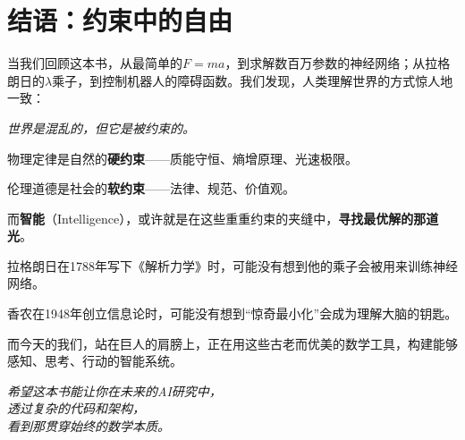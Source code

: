\documentclass[11pt,a4paper,twoside,openright]{book}
\theoremstyle{definition}
\begin{document}
 


\section*{结语：约束中的自由}


 

\vspace{1cm}

 

当我们回顾这本书，从最简单的$F = ma$，到求解数百万参数的神经网络；从拉格朗日的$\lambda$乘子，到控制机器人的障碍函数。我们发现，人类理解世界的方式惊人地一致：

 

\begin{center}

\textit{世界是混乱的，但它是被约束的。}

\end{center}

 

物理定律是自然的\textbf{硬约束}——质能守恒、熵增原理、光速极限。

 

伦理道德是社会的\textbf{软约束}——法律、规范、价值观。

 

而\textbf{智能}（Intelligence），或许就是在这些重重约束的夹缝中，\textbf{寻找最优解的那道光}。

 

\vspace{0.5cm}

 

拉格朗日在1788年写下《解析力学》时，可能没有想到他的乘子会被用来训练神经网络。

 

香农在1948年创立信息论时，可能没有想到“惊奇最小化”会成为理解大脑的钥匙。

 

而今天的我们，站在巨人的肩膀上，正在用这些古老而优美的数学工具，构建能够感知、思考、行动的智能系统。

 

\vspace{0.5cm}

 

\begin{center}

\textit{希望这本书能让你在未来的AI研究中，\\
透过复杂的代码和架构，\\
看到那贯穿始终的数学本质。}

\end{center}
\end{document}

